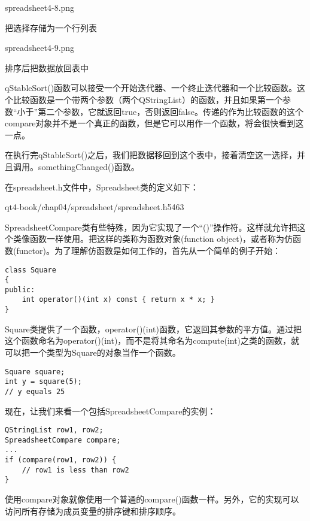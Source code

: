 \documentclass[11pt,oneside]{book}
\begin{document}
\begin{common-format}
\begin{linefig}[0.8]{spreadsheet4-8.png}
\caption{把选择存储为一个行列表}
\label{fig:spreadsheet4-8.png}
\end{linefig}

\begin{linefig}[0.8]{spreadsheet4-9.png}
\caption{排序后把数据放回表中}
\label{fig:spreadsheet4-9.png}
\end{linefig}


qStableSort()函数可以接受一个开始迭代器、一个终止迭代器和一个比较函数。这个比较函数是一个带两个参数（两个QStringList）的函数，并且如果第一个参数“小于”第二个参数，它就返回true，否则返回false。传递的作为比较函数的这个compare对象并不是一个真正的函数，但是它可以用作一个函数，将会很快看到这一点。

在执行完qStableSort()之后，我们把数据移回到这个表中，接着清空这一选择，并且调用。somethingChanged()函数。

在spreadsheet.h文件中，Spreadsheet类的定义如下：

\begin{cppline}{qt4-book/chap04/spreadsheet/spreadsheet.h}{54}{63}
\end{cppline}

SpreadsheetCompare类有些特殊，因为它实现了一个“()”操作符。这样就允许把这个类像函数一样使用。把这样的类称为函数对象(function object)，或者称为仿函数(functor)。为了理解仿函数是如何工作的，首先从一个简单的例子开始：

\begin{Verbatim}
class Square
{
public:
    int operator()(int x) const { return x * x; }
}
\end{Verbatim}

Square类提供了一个函数，operator()(int)函数，它返回其参数的平方值。通过把这个函数命名为operator()(int)，而不是将其命名为compute(int)之类的函数，就可以把一个类型为Square的对象当作一个函数。

\begin{Verbatim}
Square square;
int y = square(5);
// y equals 25
\end{Verbatim}

现在，让我们来看一个包括SpreadsheetCompare的实例：
\begin{Verbatim}
QStringList row1, row2;
SpreadsheetCompare compare;
...
if (compare(row1, row2)) {
    // row1 is less than row2
}
\end{Verbatim}

使用compare对象就像使用一个普通的compare()函数一样。另外，它的实现可以访问所有存储为成员变量的排序键和排序顺序。  


\end{common-format}
\end{document}
